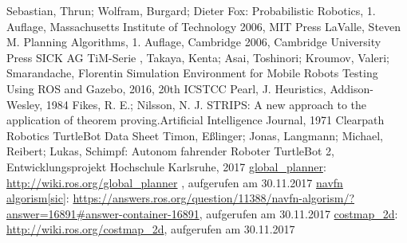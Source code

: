 \begin{thebibliography}{999}%
 Sebastian, Thrun; Wolfram, Burgard; Dieter Fox: \glqq Probabilistic Robotics\grqq , 1. Auflage, Massachusetts Institute of Technology 2006, MIT Press
 LaValle, Steven M. \glqq Planning Algorithms\grqq , 1. Auflage, Cambridge 2006, Cambridge University Press
 SICK AG \glqq TiM-Serie \grqq , 
 Takaya, Kenta; Asai, Toshinori; Kroumov, Valeri; Smarandache, Florentin \glqq Simulation Environment for Mobile Robots Testing Using ROS and Gazebo\grqq , 2016, 20th ICSTCC
 Pearl, J. \glqq Heuristics\grqq , Addison-Wesley, 1984
 Fikes, R. E.; Nilsson, N. J.  \glqq STRIPS: A new approach to the application of theorem proving.\grqq Artificial Intelligence Journal, 1971
 Clearpath Robotics \glqq TurtleBot Data Sheet 
 Timon, Eßlinger; Jonas, Langmann; Michael, Reibert; Lukas, Schimpf: \glqq Autonom fahrender Roboter TurtleBot 2\grqq , Entwicklungsprojekt Hochschule Karlsruhe, 2017
 \href{http://wiki.ros.org/global_planner}{global\_planner}:  \url{http://wiki.ros.org/global_planner} , aufgerufen am 30.11.2017
 \href{https://answers.ros.org/question/11388/navfn-algorism/?answer=16891#answer-container-16891}{navfn algorism[sic]}: \url{https://answers.ros.org/question/11388/navfn-algorism/?answer=16891#answer-container-16891}, aufgerufen am 30.11.2017
 \href{http://wiki.ros.org/costmap_2d}{costmap\_2d}: \url{http://wiki.ros.org/costmap_2d}, aufgerufen am 30.11.2017

\end{thebibliography}
